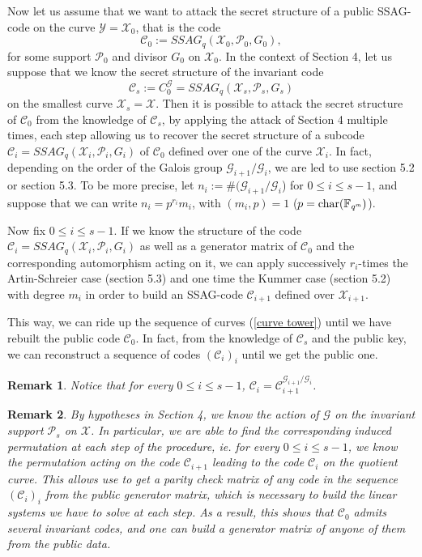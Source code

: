 \documentclass[10pt]{article}
\newtheorem{rq1}{Remark}[]
\newcommand{\s}{\vspace{0.3cm}}
\newcommand{\C}{\mathcal{C}}
\newcommand{\fqm}{\mathbb{F}_{q^m}}
\newcommand{\X}{\mathcal{X}}
\newcommand{\Y}{\mathcal{Y}}
\newcommand{\PR}{\mathcal{P}}
\newcommand{\G}{\mathcal{G}}
\begin{document}
Now let us assume that we want to attack the secret structure of a public SSAG-code on the curve $\Y=\X_0$, that is the code 
\[\C_0 := SSAG_q(\X_0,\PR_0,G_0),\]
for some support $\PR_0$ and divisor $G_0$ on $\X_0$. In the context of Section 4, let us suppose that we know the secret structure of the invariant code 
\[\C_s:= C_0^{\G} = SSAG_q(\X_s,\PR_s,G_s)\]
on the smallest curve $\X_s=\X$. Then it is possible to attack the secret structure of $\C_0$ from the knowledge of $\C_s$, by applying the attack of Section 4 multiple times, each step allowing us to recover the secret structure of a subcode $\C_i=SSAG_q(\X_i,\PR_i,G_i)$ of $\C_0$ defined over one of the curve $\X_i$. In fact, depending on the order of the Galois group $\G_{i+1}/\G_i$, we are led to use section 5.2 or section 5.3. 
To be more precise, let $n_i:= \#(\G_{i+1}/\G_i$) for $0 \leq i \leq s-1$, and suppose that we can write $n_i = p^{r_i}m_i$, with $(m_i,p)=1$ ($p=\rm char \it (\fqm)$). 
\s

Now fix $0 \leq i \leq s-1$. If we know the structure of the code $\C_i = SSAG_q(\X_i,\PR_i,G_i)$ as well as a generator matrix of $\C_0$ and the corresponding automorphism acting on it, we can apply successively $r_i$-times the Artin-Schreier case (section 5.3) and one time the Kummer case (section 5.2) with degree $m_i$ in order to build an SSAG-code $\C_{i+1}$ defined over $\X_{i+1}$. 

This way, we can ride up the sequence of curves (\ref{curve tower}) until we have rebuilt the public code $\C_0$. In fact, from the knowledge of $\C_s$ and the public key, we can reconstruct a sequence of codes $(\C_i)_i$ until we get the public one. 

\s

\begin{rq1} \rm
Notice that for every $0 \leq i \leq s-1$, $\C_i = \C_{i+1}^{\G_{i+1}/\G_i}$. 
\end{rq1}


\begin{rq1} \rm \label{induced permutation} By hypotheses in Section 4, we know the action of $\G$ on the invariant support $\PR_s$ on $\X$. In particular, we are able to find the corresponding induced permutation at each step of the procedure, ie. for every $0 \leq i \leq s-1$, we know the permutation acting on the code $\C_{i+1}$ leading to the code $\C_i$ on the quotient curve. This allows use to get a parity check matrix of any code in the sequence $(\C_i)_i$ from the public generator matrix, which is necessary to build the linear systems we have to solve at each step. As a result, this shows that $\C_0$ admits several invariant codes, and one can build a generator matrix of anyone of them from the public data.
\end{rq1}
\end{document}
